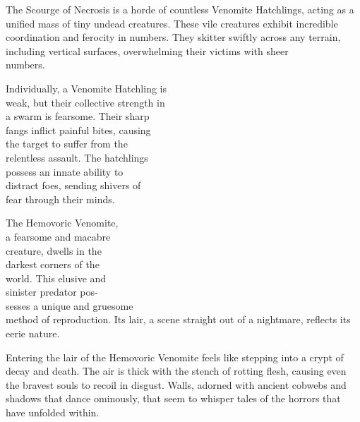 The Scourge of Necrosis is a horde of countless Venomite Hatchlings, acting as a unified mass of tiny undead creatures. These vile creatures exhibit incredible coordination and ferocity in numbers. They skitter swiftly across any terrain, including vertical surfaces, overwhelming their victims with sheer\\numbers.

Individually, a Venomite Hatchling is\\weak, but their collective strength in\\a swarm is fearsome. Their sharp\\fangs inflict painful bites, causing\\the target to suffer from the\\relentless assault. The hatchlings\\possess an innate ability to\\distract foes, sending shivers of\\fear through their minds.

\vfill\eject %

\vspace*{0.75cm}\hspace*{6.5cm}\vspace*{-2cm}%
%


The Hemovoric Venomite,\\a fearsome and macabre\\creature, dwells in the\\darkest corners of the\\world. This elusive and\\sinister predator pos-\\sesses a unique and gruesome\\method of reproduction. Its lair, a scene straight out of a nightmare, reflects its eerie nature.

Entering the lair of the Hemovoric Venomite feels like stepping into a crypt of decay and death. The air is thick with the stench of rotting flesh, causing even the bravest souls to recoil in disgust. Walls, adorned with ancient cobwebs and shadows that dance ominously, that seem to whisper tales of the horrors that have unfolded within.

